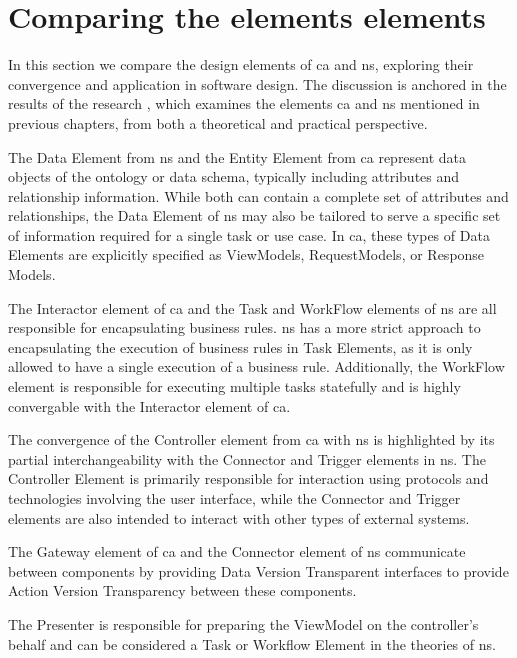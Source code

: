 \section{Comparing the elements elements}

In this section we compare the design elements of \gls{ca} and \gls{ns}, exploring their
convergence and application in software design. The discussion is anchored in the results
of the research   \cite{koks_convergence_2023}, which
examines the elements \gls{ca} and \gls{ns} mentioned in previous chapters, from both a
theoretical and practical perspective.

The Data Element from \gls{ns} and the Entity Element from \gls{ca} represent data objects
of the ontology or data schema, typically including attributes and relationship
information. While both can contain a complete set of attributes and relationships, the
Data Element of \gls{ns} may also be tailored to serve a specific set of information
required for a single task or use case. In \gls{ca}, these types of Data Elements are
explicitly specified as ViewModels, RequestModels, or Response Models.

The Interactor element of \gls{ca} and the Task and WorkFlow elements of \gls{ns} are all
responsible for encapsulating business rules. \gls{ns} has a more strict approach to
encapsulating the execution of business rules in Task Elements, as it is only allowed to
have a single execution of a business rule. Additionally, the WorkFlow element is
responsible for executing multiple tasks statefully and is highly convergable with the
Interactor element of \gls{ca}.

The convergence of the Controller element from \gls{ca} with \gls{ns} is highlighted by
its partial interchangeability with the Connector and Trigger elements in \gls{ns}. The
Controller Element is primarily responsible for interaction using protocols and
technologies involving the user interface, while the Connector and Trigger elements are
also intended to interact with other types of external systems.
 
The Gateway element of \gls{ca} and the Connector element of \gls{ns} communicate between
components by providing Data Version Transparent interfaces to provide Action Version
Transparency between these components.

The Presenter is responsible for preparing the ViewModel on the controller's behalf and
can be considered a Task or Workflow Element in the theories of \gls{ns}.

